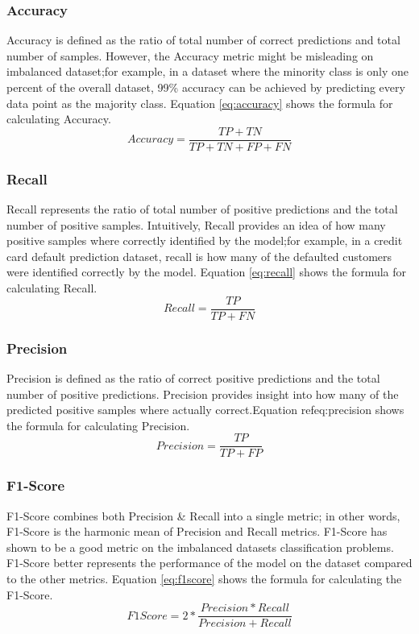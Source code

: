 \documentclass[twoside,11pt,a4paper]{article}
\begin{document}
\subsubsection{Accuracy}
Accuracy is defined as the ratio of total number of correct predictions and total number of samples. However, the Accuracy metric might be misleading on imbalanced dataset;for example, in a dataset where the minority class is only one percent of the overall dataset, 99\% accuracy can be achieved by predicting every data point as the majority class. Equation \ref{eq:accuracy} shows the formula for calculating Accuracy.
\begin{equation} \label{eq:accuracy}
	Accuracy = \frac{TP+TN}{TP+TN+FP+FN}
\end{equation}
\subsubsection{Recall}
Recall represents the ratio of total number of positive predictions and the total number of positive samples. Intuitively, Recall provides an idea of how many positive samples where correctly identified by the model;for example, in a credit card default prediction dataset, recall is how many of the defaulted customers were identified correctly by the model. Equation \ref{eq:recall} shows the formula for calculating Recall.
\begin{equation}\label{eq:recall}
	Recall = \frac{TP}{TP+FN}
\end{equation}
\subsubsection{Precision}
Precision is defined as the ratio of correct positive predictions and the total number of positive predictions. Precision provides insight into how many of the predicted positive samples where actually correct.Equation ref{eq:precision} shows the formula for calculating Precision.
\begin{equation}\label{eq:precision}
	Precision = \frac{TP}{TP+FP}
\end{equation}

\subsubsection{F1-Score}
F1-Score combines both Precision \& Recall into a single metric; in other words, F1-Score is the harmonic mean of Precision and Recall metrics. F1-Score has shown to be a good metric on the imbalanced datasets classification problems. F1-Score better represents the performance of the model on the dataset compared to the other metrics. Equation \ref{eq:f1score} shows the formula for calculating the F1-Score.
\begin{equation}\label{eq:f1score}
	F1 Score = 2 * \frac{Precision*Recall}{Precision + Recall}
\end{equation}
\end{document}
